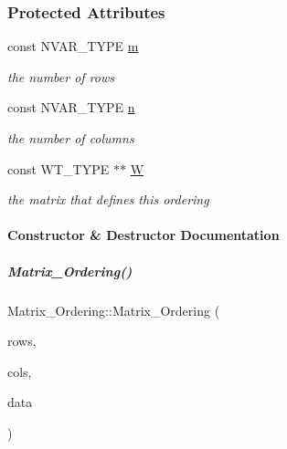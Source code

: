 \subsubsection*{Protected Attributes}
\begin{DoxyCompactItemize}
\item 
\mbox{\label{group__orderinggroup_a29f4b562f274f6bee1c3f3826a5d1cce}} 
const N\+V\+A\+R\+\_\+\+T\+Y\+PE \hyperlink{group__orderinggroup_a29f4b562f274f6bee1c3f3826a5d1cce}{m}
\begin{DoxyCompactList}\small\item\em the number of rows \end{DoxyCompactList}\item 
\mbox{\label{group__orderinggroup_a6508f4b4a5d5cac0da07ddea10c97d62}} 
const N\+V\+A\+R\+\_\+\+T\+Y\+PE \hyperlink{group__orderinggroup_a6508f4b4a5d5cac0da07ddea10c97d62}{n}
\begin{DoxyCompactList}\small\item\em the number of columns \end{DoxyCompactList}\item 
\mbox{\label{group__orderinggroup_a98a4930577909a94fb3b8ba734d0c2e2}} 
const W\+T\+\_\+\+T\+Y\+PE $\ast$$\ast$ \hyperlink{group__orderinggroup_a98a4930577909a94fb3b8ba734d0c2e2}{W}
\begin{DoxyCompactList}\small\item\em the matrix that defines this ordering \end{DoxyCompactList}\end{DoxyCompactItemize}


\paragraph{Constructor \& Destructor Documentation}
\mbox{\label{group__orderinggroup_a59c24eeefe79a784f51253dcd0a51101}} 
\subparagraph{\texorpdfstring{Matrix\+\_\+\+Ordering()}{Matrix\_Ordering()}}
{\footnotesize\ttfamily Matrix\+\_\+\+Ordering\+::\+Matrix\+\_\+\+Ordering (\begin{DoxyParamCaption}\item[{N\+V\+A\+R\+\_\+\+T\+Y\+PE}]{rows,  }\item[{N\+V\+A\+R\+\_\+\+T\+Y\+PE}]{cols,  }\item[{const W\+T\+\_\+\+T\+Y\+PE $\ast$$\ast$}]{data }\end{DoxyParamCaption})}



